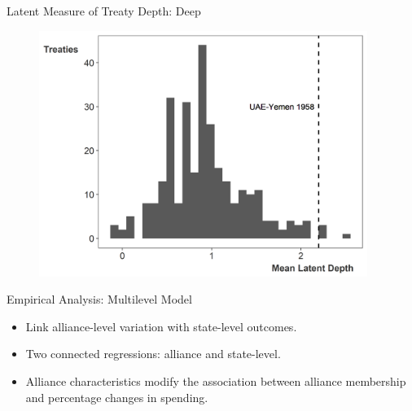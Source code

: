 \documentclass[12pt]{beamer}
\begin{document}

\begin{frame}{Latent Measure of Treaty Depth: Deep}

\begin{figure}[htbp]
	\centering
		\includegraphics[width=0.95\textwidth]{ld-hist-deep.png}
\end{figure}


\end{frame} 



\begin{frame}{Empirical Analysis: Multilevel Model}

\begin{itemize} 
\item Link alliance-level variation with state-level outcomes. 
\pause
\item Two connected regressions: alliance and state-level. 
\pause 
\item Alliance characteristics modify the association between alliance membership and percentage changes in spending.  
\end{itemize} 

\end{frame} 


\end{document}
